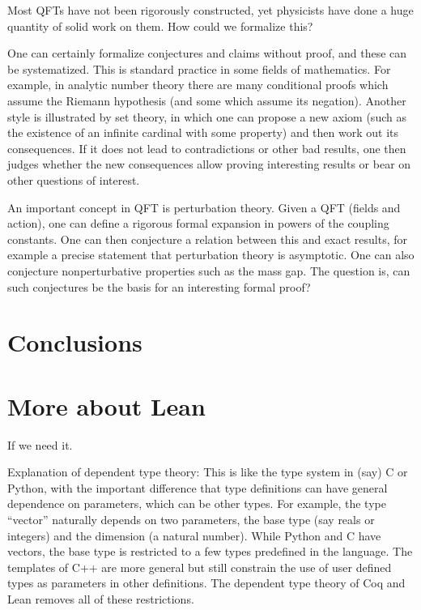 \documentclass{article}
\newcommand{\1}{\mathbbm{1}}
\theoremstyle{plain}
\theoremstyle{definition}
\numberwithin{equation}{section}
\begin{document}
Most QFTs have not been rigorously constructed, yet physicists have done a huge quantity of solid work on them.  How could we formalize this?

One can certainly formalize conjectures and claims without proof, and these can be systematized.  
This is standard practice in some fields of mathematics.  For example, in analytic number theory there are many conditional proofs which
assume the Riemann hypothesis (and some which assume its negation).  Another style is illustrated by set theory, 
in which one can propose a new axiom (such as the existence of an infinite cardinal with some property) and then work out its
consequences.  If it does not lead to contradictions or other bad results, one then judges whether the new consequences allow
proving interesting results or bear on other questions of interest. 

An important concept in QFT is perturbation theory.  Given a QFT (fields and action), one can define a rigorous formal expansion
in powers of the coupling constants.  One can then conjecture a relation between this and exact results, for example a precise statement
that perturbation theory is asymptotic.  One can also conjecture nonperturbative properties such as the mass gap.  The question is, can such
conjectures be the basis for an interesting formal proof?

\section{Conclusions}

\appendix

\section{More about Lean}

If we need it.

Explanation of dependent type theory:
This is like the type system in (say) C or Python, with the important difference that type definitions can have
general dependence on parameters, which can be other types.  
For example, the type ``vector'' naturally depends on two parameters, the base
type (say reals or integers) and the dimension (a natural number).  While Python and C have vectors, the base type
is restricted to a few types predefined in the language.  The templates of C++ are more general but still constrain
the use of user defined types as parameters in other definitions.  The dependent type theory of Coq and Lean
removes all of these restrictions.
\end{document}
